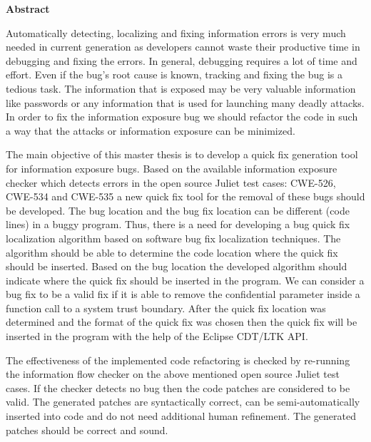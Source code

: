 

\clearemptydoublepage
{}
{}	





\vspace*{2cm}
\begin{center}
{\Large \bf Abstract}
\end{center}
\vspace{1cm}

Automatically detecting, localizing and fixing information errors is very much needed
in current generation as developers cannot waste their productive time in debugging and fixing the errors. 
In general, debugging requires a lot
of time and effort. Even if the bug's root cause is known, tracking and fixing the bug
is a tedious task.
The information that is exposed may be very valuable information
like passwords or any information that is used for launching many deadly attacks.
In order to fix the information exposure bug we should refactor the code in such
a way that the attacks or information exposure can be minimized. 


The main objective of this master thesis is to develop a quick fix generation tool for information
exposure bugs. Based on the available information exposure checker which detects
errors in the open source Juliet test cases: CWE-526, CWE-534 and CWE-535 a new
quick fix tool for the removal of these bugs should be developed. The bug location and
the bug fix location can be different (code lines) in a buggy program. Thus, 
there is a need for developing a bug quick fix localization algorithm based on software bug fix
localization techniques. The algorithm should be able to determine the code 
location where the quick
fix should be inserted. Based on the bug location the developed algorithm should
indicate where the quick fix should be inserted in the program.
We can consider a bug fix to be a valid fix if it is able to remove the confidential parameter inside a
function call to a system trust boundary. After the quick fix location was determined and the format
of the quick fix was chosen then the quick fix will be inserted in the program with the
help of the Eclipse CDT/LTK API.


The effectiveness of the implemented code refactoring is checked by re-running the information flow checker
on the above mentioned open source Juliet test cases. If the checker detects no bug then
the code patches are considered to be valid. The generated patches are syntactically
correct, can be semi-automatically inserted into code and do not need
additional human refinement. The generated patches should be correct and sound.
